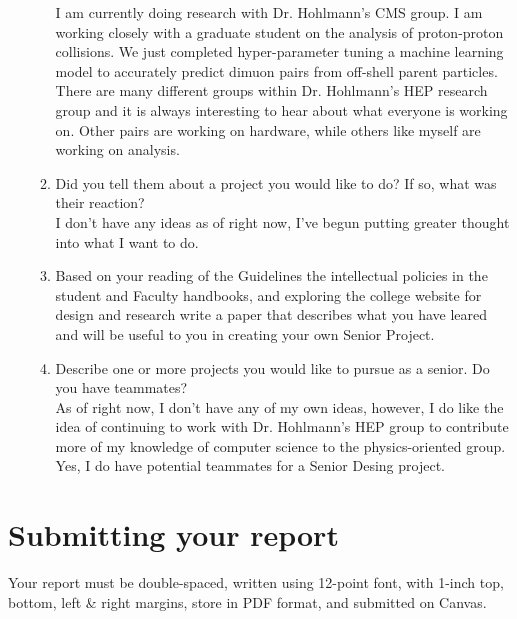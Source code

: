 \documentclass{article}
\begin{document}
\begin{itemize}
\begin{enumerate}
                  I am currently doing research with Dr. Hohlmann's CMS group. I am working closely with a graduate student on the analysis of
                  proton-proton collisions. We just completed hyper-parameter tuning a machine learning model to accurately predict dimuon pairs
                  from off-shell parent particles. There are many different groups within Dr. Hohlmann's HEP research group and it is always interesting
                  to hear about what everyone is working on. Other pairs are working on hardware, while others like myself are working on analysis. \\


            \item Did you tell them about a project you would like to do? If so, what was their reaction? \\

                  I don't have any ideas as of right now, I've begun putting greater thought into what I want to do. \\

            \item Based on your reading of the Guidelines the intellectual policies in the student and Faculty
                  handbooks, and exploring the college website for design and research write a paper that describes
                  what you have leared and will be useful to you in creating your own Senior Project. \\

                        

            \item Describe one or more projects you would like to pursue as a senior. Do you have teammates? \\
            
                  As of right now, I don't have any of my own ideas, however, I do like the idea of continuing to work with Dr. Hohlmann's HEP
                  group to contribute more of my knowledge of computer science to the physics-oriented group. Yes, I do have potential teammates
                  for a Senior Desing project.
            
                  
          \end{enumerate}
\end{itemize}

\section*{Submitting your report}

Your report must be double-spaced, written using 12-point font, with 1-inch top, bottom, left \& right margins,
store in PDF format, and submitted on Canvas.
\end{document}

